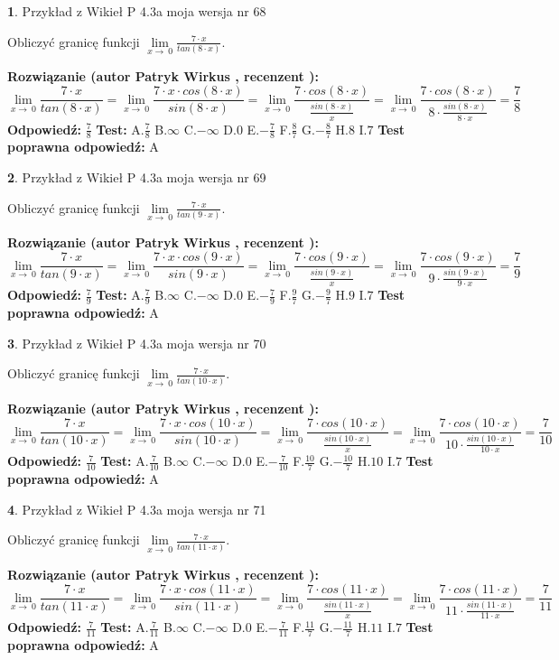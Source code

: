\documentclass[12pt, a4paper]{article}
\theoremstyle{definition} %
\newtheorem{zad}{}
\newcommand{\zadStart}[1]{\begin{zad}#1\newline}
\newcommand{\zadStop}{\end{zad}}
\newcommand{\rozwStart}[2]{\noindent \textbf{Rozwiązanie (autor #1 , recenzent #2): }\newline}
\newcommand{\rozwStop}{\newline}
\newcommand{\odpStart}{\noindent \textbf{Odpowiedź:}\newline}
\newcommand{\odpStop}{\newline}
\newcommand{\testStart}{\noindent \textbf{Test:}\newline}
\newcommand{\testStop}{\newline}
\newcommand{\kluczStart}{\noindent \textbf{Test poprawna odpowiedź:}\newline}
\newcommand{\kluczStop}{\newline}
\begin{document}
\zadStart{Przykład z Wikieł P 4.3a moja wersja nr 68}


Obliczyć granicę funkcji $\lim\limits_{x\to\ 0}\frac{7 \cdot x}{tan(8 \cdot x)}$.
\zadStop
\rozwStart{Patryk Wirkus}{}
$$\lim\limits_{x\to\ 0}\frac{7 \cdot x}{tan(8 \cdot x)}=\lim\limits_{x\to\ 0}\frac{7 \cdot x \cdot cos(8 \cdot x)}{sin(8 \cdot x)}=\lim\limits_{x\to\ 0}\frac{7 \cdot cos(8 \cdot x)}{\frac{sin(8 \cdot x)}{x}}=\lim\limits_{x\to\ 0}\frac{7 \cdot cos(8 \cdot x)}{8 \cdot \frac{sin(8 \cdot x)}{8 \cdot x}} = \frac{7}{8}$$
\rozwStop
\odpStart
$\frac{7}{8}$
\odpStop
\testStart
A.$\frac{7}{8}$
B.$\infty$
C.$-\infty$
D.$0$
E.$-\frac{7}{8}$
F.$\frac{8}{7}$
G.$-\frac{8}{7}$
H.$8$
I.$7$
\testStop
\kluczStart
A
\kluczStop



\zadStart{Przykład z Wikieł P 4.3a moja wersja nr 69}


Obliczyć granicę funkcji $\lim\limits_{x\to\ 0}\frac{7 \cdot x}{tan(9 \cdot x)}$.
\zadStop
\rozwStart{Patryk Wirkus}{}
$$\lim\limits_{x\to\ 0}\frac{7 \cdot x}{tan(9 \cdot x)}=\lim\limits_{x\to\ 0}\frac{7 \cdot x \cdot cos(9 \cdot x)}{sin(9 \cdot x)}=\lim\limits_{x\to\ 0}\frac{7 \cdot cos(9 \cdot x)}{\frac{sin(9 \cdot x)}{x}}=\lim\limits_{x\to\ 0}\frac{7 \cdot cos(9 \cdot x)}{9 \cdot \frac{sin(9 \cdot x)}{9 \cdot x}} = \frac{7}{9}$$
\rozwStop
\odpStart
$\frac{7}{9}$
\odpStop
\testStart
A.$\frac{7}{9}$
B.$\infty$
C.$-\infty$
D.$0$
E.$-\frac{7}{9}$
F.$\frac{9}{7}$
G.$-\frac{9}{7}$
H.$9$
I.$7$
\testStop
\kluczStart
A
\kluczStop



\zadStart{Przykład z Wikieł P 4.3a moja wersja nr 70}


Obliczyć granicę funkcji $\lim\limits_{x\to\ 0}\frac{7 \cdot x}{tan(10 \cdot x)}$.
\zadStop
\rozwStart{Patryk Wirkus}{}
$$\lim\limits_{x\to\ 0}\frac{7 \cdot x}{tan(10 \cdot x)}=\lim\limits_{x\to\ 0}\frac{7 \cdot x \cdot cos(10 \cdot x)}{sin(10 \cdot x)}=\lim\limits_{x\to\ 0}\frac{7 \cdot cos(10 \cdot x)}{\frac{sin(10 \cdot x)}{x}}=\lim\limits_{x\to\ 0}\frac{7 \cdot cos(10 \cdot x)}{10 \cdot \frac{sin(10 \cdot x)}{10 \cdot x}} = \frac{7}{10}$$
\rozwStop
\odpStart
$\frac{7}{10}$
\odpStop
\testStart
A.$\frac{7}{10}$
B.$\infty$
C.$-\infty$
D.$0$
E.$-\frac{7}{10}$
F.$\frac{10}{7}$
G.$-\frac{10}{7}$
H.$10$
I.$7$
\testStop
\kluczStart
A
\kluczStop



\zadStart{Przykład z Wikieł P 4.3a moja wersja nr 71}


Obliczyć granicę funkcji $\lim\limits_{x\to\ 0}\frac{7 \cdot x}{tan(11 \cdot x)}$.
\zadStop
\rozwStart{Patryk Wirkus}{}
$$\lim\limits_{x\to\ 0}\frac{7 \cdot x}{tan(11 \cdot x)}=\lim\limits_{x\to\ 0}\frac{7 \cdot x \cdot cos(11 \cdot x)}{sin(11 \cdot x)}=\lim\limits_{x\to\ 0}\frac{7 \cdot cos(11 \cdot x)}{\frac{sin(11 \cdot x)}{x}}=\lim\limits_{x\to\ 0}\frac{7 \cdot cos(11 \cdot x)}{11 \cdot \frac{sin(11 \cdot x)}{11 \cdot x}} = \frac{7}{11}$$
\rozwStop
\odpStart
$\frac{7}{11}$
\odpStop
\testStart
A.$\frac{7}{11}$
B.$\infty$
C.$-\infty$
D.$0$
E.$-\frac{7}{11}$
F.$\frac{11}{7}$
G.$-\frac{11}{7}$
H.$11$
I.$7$
\testStop
\kluczStart
A
\kluczStop
\end{document}
